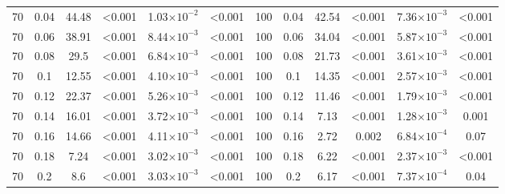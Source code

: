 \documentclass[12pt]{article}
\begin{document}
\begin{table}[hb!]
\begin{tabular}{c c | c c| c c ||c c | c c | c c |}
                70  & 0.04  & 44.48 & \textless0.001 & 1.03$\times10^{-2}$ & \textless0.001 & 100 & 0.04  & 42.54 & \textless0.001 & 7.36$\times10^{-3}$ & \textless0.001 \\
                70  & 0.06  & 38.91 & \textless0.001 & 8.44$\times10^{-3}$ & \textless0.001 & 100 & 0.06  & 34.04 & \textless0.001 & 5.87$\times10^{-3}$ & \textless0.001 \\
                70  & 0.08  & 29.5  & \textless0.001 & 6.84$\times10^{-3}$ & \textless0.001 & 100 & 0.08  & 21.73 & \textless0.001 & 3.61$\times10^{-3}$ & \textless0.001 \\
                70  & 0.1 & 12.55 & \textless0.001 & 4.10$\times10^{-3}$ & \textless0.001 & 100 & 0.1 & 14.35 & \textless0.001 & 2.57$\times10^{-3}$ & \textless0.001 \\
                70  & 0.12  & 22.37 & \textless0.001 & 5.26$\times10^{-3}$ & \textless0.001 & 100 & 0.12  & 11.46 & \textless0.001 & 1.79$\times10^{-3}$ & \textless0.001 \\
                70  & 0.14  & 16.01 & \textless0.001 & 3.72$\times10^{-3}$ & \textless0.001 & 100 & 0.14  & 7.13  & \textless0.001 & 1.28$\times10^{-3}$ & 0.001  \\
                70  & 0.16  & 14.66 & \textless0.001 & 4.11$\times10^{-3}$ & \textless0.001 & 100 & 0.16  & 2.72  & 0.002  & 6.84$\times10^{-4}$ & 0.07 \\
                70  & 0.18  & 7.24  & \textless0.001 & 3.02$\times10^{-3}$ & \textless0.001 & 100 & 0.18  & 6.22  & \textless0.001 & 2.37$\times10^{-3}$ & \textless0.001 \\
                70  & 0.2 & 8.6 & \textless0.001 & 3.03$\times10^{-3}$ & \textless0.001 & 100 & 0.2 & 6.17  & \textless0.001 & 7.37$\times10^{-4}$ & 0.04 \\
        \hline
	    \end{tabular}
	    \end{table}
\end{document}
